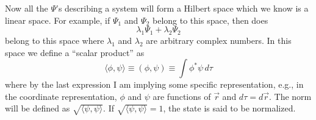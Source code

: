 Now all the $\Psi$'s describing a system will form a Hilbert space which we know is a linear space. For example, if $\Psi_1$ and $\Psi_2$ belong to this space, then does $$\lambda_1\Psi_1 + \lambda_2\Psi_2$$ belong to this space where $\lambda_1$ and $\lambda_2$ are arbitrary complex numbers. In this space we define a ``scalar product'' as 
$$\langle \phi,\psi\rangle  \equiv (\phi,\psi) \equiv \int \phi^*\psi\, d\tau$$ where by the last expression I am implying some specific representation, e.g., in the coordinate representation, $\phi$ and $\psi$ are functions of $\vec{r}$ and $d\tau = d\vec{r}$. The norm will be defined as $\sqrt{\langle \psi,\psi\rangle }$. If $\sqrt{\langle \psi,\psi\rangle } = 1$, the state is said to be normalized. 
